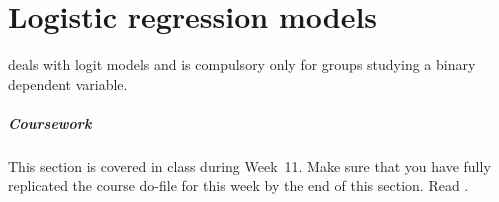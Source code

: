 %
%
\chapter[Logistic models]{Logistic regression models}%
	\label{ch:log}%
  \begin{mybox}
     deals with logit models and is compulsory only for groups studying a binary dependent variable. %
    
    \paragraph{Coursework} %
    This section is covered in class during Week~11. Make sure that you have fully replicated the course do-file for this week by the end of this section. Read  \citeauthor[ch.~12.1--12.2 and 13.1--13.3]{FeinsteinThomas:2002d}.%
  \end{mybox}\\[4em]%
  \startcontents[chapters]%
	\newpage

%
%
%
%

\stopcontents[chapters]

%
%

